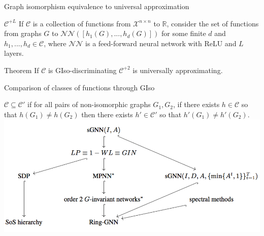 \documentclass{beamer}
\begin{document}
\begin{frame}{Graph isomorphism equivalence to universal approximation}

\begin{block}{$\mathcal C^{+L}$}
If $\mathcal{C}$ is a collection of functions from $\mathcal{X}^{n \times n}$ to $\mathbb{R}$, consider the set of functions from graphs $G$ to $\mathcal{NN}([h_1(G), ..., h_d(G)])$ for some finite $d$ and $h_1, ..., h_d \in \mathcal{C}$, where $\mathcal{NN}$ is a feed-forward neural network with ReLU and $L$ layers.
\end{block}

\bigskip

\begin{block}{Theorem}
If $\mathcal{C}$ is GIso-discriminating $\mathcal C^{+2}$ is universally approximating.
\end{block}
\let\thefootnote\relax{}
\end{frame}

\begin{frame}{Comparison of classes of functions through GIso}

$\mathcal C \subseteq \mathcal C'$ if for all pairs of non-isomorphic graphs $G_1, G_2$, if there exists $h \in \mathcal C$ so that $h(G_1)\neq h(G_2)$ then there exists $h' \in \mathcal C'$ so that $h'(G_1)\neq h'(G_2)$.
\includegraphics[width=\textwidth]{figs/GISO}

\end{frame}
\end{document}
